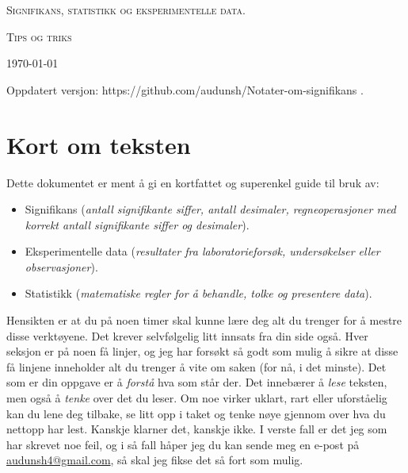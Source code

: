 \documentclass[a4paper,9pt]{article}
\begin{document}
\begin{centering}
	{\scshape\Large  Signifikans, statistikk og eksperimentelle data. \par}
	\vspace{1cm}
	{\scshape\Large Tips og triks    \par}
	\vspace{1.5cm}
	{\huge\bfseries \par}
	\vspace{2cm}

	{\large \today\par}
\end{centering}

\vspace{1cm}

Oppdatert versjon: https://github.com/audunsh/Notater-om-signifikans .


\tableofcontents


\pagebreak

\section{Kort om teksten}

Dette dokumentet er ment å gi en kortfattet og superenkel guide til bruk av:

\begin{itemize}
\item Signifikans (\emph{antall signifikante siffer, antall desimaler, regneoperasjoner med korrekt antall signifikante siffer og desimaler}).
\item Eksperimentelle data (\emph{resultater fra laboratorieforsøk, undersøkelser eller observasjoner}).
\item Statistikk (\emph{matematiske regler for å behandle, tolke og presentere data}).
\end{itemize}

Hensikten er at du på noen timer skal kunne lære deg alt du trenger for å mestre disse verktøyene.  Det krever selvfølgelig litt innsats fra din side også. Hver seksjon er på noen få linjer, og jeg har forsøkt så godt som mulig å sikre at disse få linjene inneholder alt du trenger å vite om saken (for nå, i det minste). Det som er din oppgave er å \emph{forstå} hva som står der. Det innebærer å \emph{lese} teksten, men også å \emph{tenke} over det du leser. Om noe virker uklart, rart eller uforståelig kan du lene deg tilbake, se litt opp i taket og tenke nøye gjennom over hva du nettopp har lest. Kanskje klarner det, kanskje ikke. I verste fall er det jeg som har skrevet noe feil, og i så fall håper jeg du kan sende meg en e-post på \href{mailto:audunsh4@gmail.com}{audunsh4@gmail.com}, så skal jeg fikse det så fort som mulig.
\end{document}

